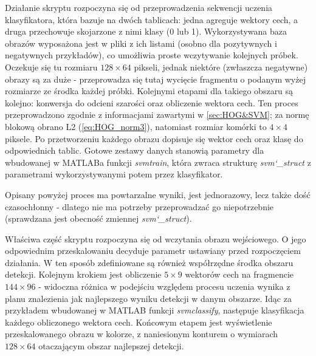 Działanie skryptu rozpoczyna się od przeprowadzenia sekwencji uczenia klasyfikatora, która bazuje na dwóch tablicach: jedna agreguje wektory cech, a druga przechowuje skojarzone z nimi klasy (0 lub 1). Wykorzystywana baza obrazów wyposażona jest w pliki z ich listami (osobno dla pozytywnych i negatywnych przykładów), co umożliwia proste wczytywanie kolejnych próbek. Oczekuje się tu rozmiaru $128\times 64$ pikseli, jednak niektóre (zwłaszcza negatywne) obrazy są za duże - przeprowadza się tutaj wycięcie fragmentu o podanym wyżej rozmiarze ze środka każdej próbki. Kolejnymi etapami dla takiego obszaru są kolejno: konwersja do odcieni szarości oraz obliczenie wektora cech. Ten proces przeprowadzono zgodnie z informacjami zawartymi w \ref{sec:HOG&SVM}; za normę blokową obrano L2 (\ref{eq:HOG_norm3}), natomiast rozmiar komórki to $4\times 4$ piksele. Po przetworzeniu każdego obrazu dopisuje się wektor cech oraz klasę do odpowiednich tablic.
\newline
Gotowe zestawy danych stanowią parametry dla wbudowanej w MATLABa funkcji \textit{svmtrain}, która zwraca strukturę \textit{svm\char`_struct} z parametrami wykorzystywanymi potem przez klasyfikator.

Opisany powyżej proces ma powtarzalne wyniki, jest jednorazowy, lecz także dość czasochłonny - dlatego nie ma potrzeby przeprowadzać go niepotrzebnie (sprawdzana jest obecność zmiennej \textit{svm\char`_struct}).

Właściwa część skryptu rozpoczyna się od wczytania obrazu wejściowego. O jego odpowiednim przeskalowaniu decyduje parametr ustawiany przed rozpoczęciem działania. W ten sposób zdefiniowane są również współrzędne środka obszaru detekcji. Kolejnym krokiem jest obliczenie $5\times 9$ wektorów cech na fragmencie $144 \times 96$ - widoczna różnica w podejściu względem procesu uczenia wynika z planu znalezienia jak najlepszego wyniku detekcji w danym obszarze. Idąc za przykładem wbudowanej w MATLAB funkcji \textit{svmclassify}, następuje klasyfikacja każdego obliczonego wektora cech. Końcowym etapem jest wyświetlenie przeskalowanego obrazu w kolorze, z naniesionym konturem o wymiarach $128\times 64$ otaczającym obszar najlepszej detekcji.